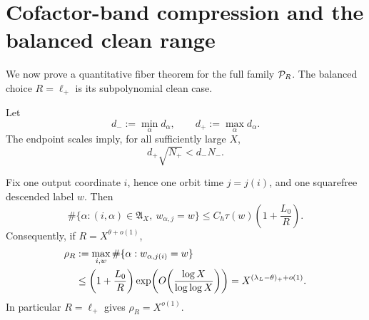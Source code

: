 \section{Cofactor-band compression and the balanced clean range}
\label{sec:tpc45-balanced-compression}

We now prove a quantitative fiber theorem for the full family
\(\mathcal P_R\).  The balanced choice \(R=\ell_+\) is its subpolynomial clean
case.

Let
\begin{equation}
 d_-:=\min_\alpha d_\alpha,
 \qquad d_+:=\max_\alpha d_\alpha.
 \label{eq:tpc45-d-extrema}
\end{equation}
The endpoint scales imply, for all sufficiently large \(X\),
\begin{equation}
 d_+\sqrt{N_+}<d_-N_-.
 \label{eq:tpc45-touched-untouched-separation}
\end{equation}

\begin{theorem}
\label{thm:tpc45-balanced-fibers}
Fix one output coordinate \(i\), hence one orbit time \(j=j(i)\), and
one squarefree descended label \(w\).  Then
\begin{equation}
 \#\{\alpha:(i,\alpha)\in\mathfrak A_X,\
             w_{\alpha,j}=w\}
 \le C_h\tau(w)\left(1+\frac{L_0}{R}\right).
 \label{eq:tpc45-balanced-fiber-bound}
\end{equation}
Consequently, if \(R=X^{\theta+o(1)}\),
\begin{align}
 \rho_R
 &:=\max_{i,w}\#\{\alpha:w_{\alpha,j(i)}=w\}
 \notag\\
 &\le
 \left(1+\frac{L_0}{R}\right)
 \exp\!\left(
  O\!\left(\frac{\log X}{\log\log X}\right)
 \right)
 =X^{(\lambda_L-\theta)_++o(1)}.
 \label{eq:tpc45-rho-balanced}
\end{align}
In particular \(R=\ell_+\) gives \(\rho_R=X^{o(1)}\).
\end{theorem}

